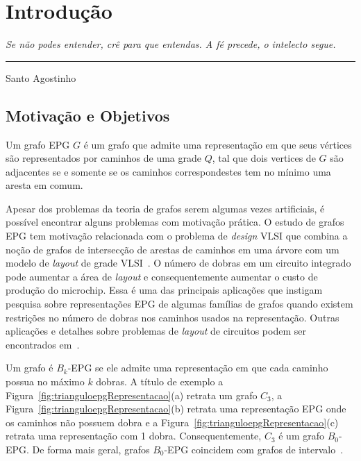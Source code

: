 \chapter{Introdução}

\begin{flushright}
\begin{minipage}[t][0cm][b]{0.47\textwidth}
\emph{Se não podes entender, crê para que entendas. A fé precede, o intelecto segue.}
\end{minipage}

\rule[0cm]{7cm}{0.03cm}%

Santo Agostinho
\end{flushright}


\section{Motivação e Objetivos}

Um grafo EPG $G$ é um grafo que admite uma representação em que seus vértices são representados por caminhos de uma grade $Q$, tal que dois vertices de $G$ são adjacentes se e somente se os caminhos correspondestes tem no mínimo uma aresta em comum.

Apesar dos problemas da teoria de grafos serem algumas vezes artificiais, é possível encontrar alguns problemas com motivação prática. O estudo de grafos EPG tem motivação relacionada com o problema de \textit{design} VLSI que combina a noção de grafos de intersecção de arestas de caminhos em uma árvore com um modelo de \textit{layout} de grade VLSI~\cite{golumbic2009}. O número de dobras em um circuito integrado pode aumentar a área de \textit{layout} e consequentemente aumentar o custo de produção do microchip. 
Essa é uma das principais aplicações que instigam pesquisa sobre representações EPG de algumas famílias de grafos quando existem restrições no número de dobras nos caminhos usados na representação.
Outras aplicações e detalhes sobre problemas de \textit{layout} de circuitos podem ser encontrados em~\cite{bandy1990, molitor1991}.   

Um grafo é $ B_k$-EPG se ele admite uma representação em que cada caminho possua no máximo $k$ dobras. A título de exemplo a Figura~\ref{fig:trianguloepgRepresentacao}(a) retrata um grafo $C_3$, a Figura~\ref{fig:trianguloepgRepresentacao}(b) retrata uma representação EPG onde os caminhos não possuem dobra e a  Figura~\ref{fig:trianguloepgRepresentacao}(c) retrata uma representação com 1 dobra. Consequentemente, $C_3$ é um grafo  $B_0$-EPG. De forma mais geral, grafos $B_0$-EPG coincidem com grafos de intervalo~\cite{golumbic2009}.

